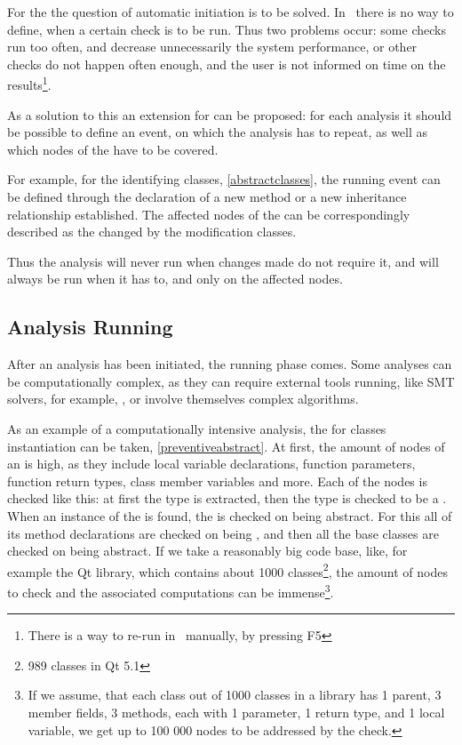 For the  the question of automatic initiation is to be solved. In \jbmps\ there is no 
way to define, when a certain check is to be run. Thus two problems occur: some checks run too often, and 
decrease unnecessarily the system performance, or other checks do not happen often enough, and the user is not 
informed on time on the results\footnote{There is a way to re-run  in \jbmps\ manually,
by pressing F5}. 

As a solution to this an  extension for can be proposed: for each analysis it should be possible 
to define an event, on which the analysis has to repeat, as well as which nodes of the  have to be covered.

For example, for the  identifying  classes, \ref{abstractclasses}, the running
event can be defined through the declaration of a new method or a new inheritance relationship established. The 
affected nodes of the  can be correspondingly described as the changed by the modification classes.

Thus the analysis will never run when changes made do not require it, and will always be run when 
it has to, and only on the affected nodes.


\subsection{Analysis Running}

After an analysis has been initiated, the running phase comes. Some analyses can be computationally complex,
as they can require external tools running, like SMT solvers, for example, \cite{2012_ratiu_modular_dsls_and_analyses},
or involve themselves complex algorithms.


As an example of a computationally intensive analysis, the  for  classes 
instantiation can be taken, \ref{preventiveabstract}. At first, the amount of nodes of an  is high,
as they include local variable declarations, function parameters, function return types, class member variables
and more. Each of the nodes is checked like this: at first the type is extracted, then the type is checked to be 
a . When an instance of the  is found, the  is checked on being abstract.
For this all of its method declarations are checked on being , and then all the base classes are 
checked on being abstract. If we take a reasonably big code base, like, for example the Qt library, which contains about 1000
classes\footnote{989 classes in Qt 5.1}, the amount of nodes to check and the associated computations can be immense\footnote{If we assume,
that each class out of 1000 classes in a library has 1 parent, 3 member fields, 3 methods, each with 1 parameter, 1 return type, and 1 local variable,
we get up to 100 000 nodes to be addressed by the check.}.

